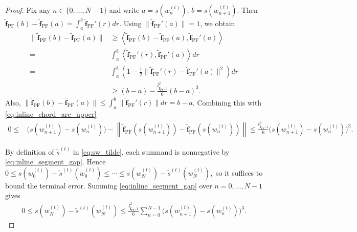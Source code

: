 \documentclass{article}
\newcommand{\f}{\mathbf{f}}
\begin{document}
\begin{proof}
Fix any $n\in\{0,\dots,N-1\}$ and write
$a=s(w_n^{(t)})$, $b=s(w_{n+1}^{(t)})$.
Then $\tilde{\f}_{\mathrm{PF}}(b)-\tilde{\f}_{\mathrm{PF}}(a)=\int_a^b \tilde{\f}_{\mathrm{PF}}'(r) dr$.
Using $\|\tilde{\f}_{\mathrm{PF}}'(a)\|=1$, we obtain
\begin{align}
\|\tilde{\f}_{\mathrm{PF}}(b)-\tilde{\f}_{\mathrm{PF}}(a)\|
&\ge
\left\langle
\tilde{\f}_{\mathrm{PF}}(b)-\tilde{\f}_{\mathrm{PF}}(a),
\tilde{\f}_{\mathrm{PF}}'(a)
\right\rangle
\nonumber\\
= &
\int_a^b
\left\langle
\tilde{\f}_{\mathrm{PF}}'(r),
\tilde{\f}_{\mathrm{PF}}'(a)
\right\rangle dr
\nonumber\\
= &
\int_a^b
\left(
1-\frac12
\|\tilde{\f}_{\mathrm{PF}}'(r)-\tilde{\f}_{\mathrm{PF}}'(a)\|^2
\right)dr
\nonumber\\
&\ge
(b-a)-\frac{l_{\tilde{\f}_{\mathrm{PF}},1}^2}{6}(b-a)^3.
\label{eq:inline_chord_arc_upper}
\end{align}
Also, $\|\tilde{\f}_{\mathrm{PF}}(b)-\tilde{\f}_{\mathrm{PF}}(a)\| \le \int_a^b \|\tilde{\f}_{\mathrm{PF}}'(r)\|dr = b-a$.
Combining this with \eqref{eq:inline_chord_arc_upper} 
\begin{align}
0
\le&
\bigl(s(w_{n+1}^{(t)})-s(w_n^{(t)})\bigr)
-
\left\|
\tilde{\f}_{\mathrm{PF}}(s(w_{n+1}^{(t)}))
-
\tilde{\f}_{\mathrm{PF}}(s(w_n^{(t)}))
\right\| \le 
\frac{l_{\tilde{\f}_{\mathrm{PF}},1}^2}{6}
\bigl(s(w_{n+1}^{(t)})-s(w_n^{(t)})\bigr)^3.
\label{eq:inline_segment_gap}
\end{align}

By definition of $\tilde s^{(t)}$ in \eqref{eq:sw_tilde}, each summand is nonnegative by \eqref{eq:inline_segment_gap}. Hence
$
0\le s(w_0^{(t)})-\tilde s^{(t)}(w_0^{(t)})\le \cdots \le s(w_N^{(t)})-\tilde s^{(t)}(w_N^{(t)}),
$
so it suffices to bound the terminal error. Summing
\eqref{eq:inline_segment_gap} over $n=0,\dots,N-1$ gives
\begin{align}
0\le
s(w_N^{(t)})-\tilde s^{(t)}(w_N^{(t)})
\le
\frac{l_{\tilde{\f}_{\mathrm{PF}},1}^2}{6}
\sum_{n=0}^{N-1}
\bigl(s(w_{n+1}^{(t)})-s(w_n^{(t)})\bigr)^3.
\label{eq:polyline_terminal_basic_inline}
\end{align}



\end{proof}
\end{document}
